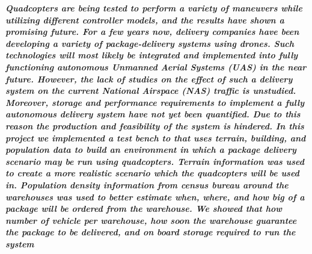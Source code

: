 \textbf{\textit{Quadcopters are being tested to perform a variety of maneuvers while utilizing different controller models, and the results have shown a promising future. For a few years now, delivery companies have been developing a variety of package-delivery systems using drones. Such technologies will most likely be integrated and implemented into fully functioning autonomous Unmanned Aerial Systems (UAS) in the near future. However, the lack of studies on the effect of such a delivery system on the current National Airspace (NAS) traffic is unstudied.  Moreover, storage and performance requirements to implement a fully autonomous delivery system have not yet been quantified. Due to this reason the production and feasibility of the system is hindered. In this project we implemented a test bench to  that uses terrain, building, and population data to build an environment in which a package delivery scenario may be run using quadcopters.  Terrain information was used to create a more realistic scenario which the quadcopters will be used in. Population density information from census bureau around the warehouses was used to better estimate when, where, and how big of a package will be ordered from the warehouse.  We showed that how number of vehicle per warehouse, how soon the warehouse guarantee the package to be delivered, and on board storage required to run the system} }


